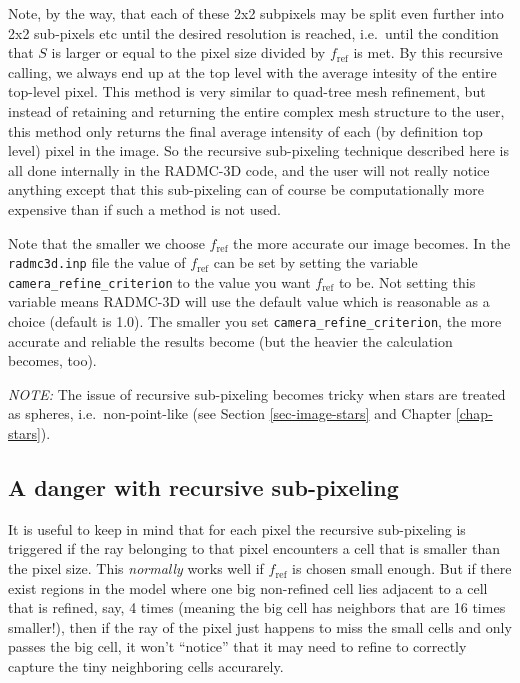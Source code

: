 \documentclass{report}
\begin{document}
Note, by the way, that each of these 2x2 subpixels may be split even further
into 2x2 sub-pixels etc until the desired resolution is reached, i.e.\ until
the condition that $S$ is larger or equal to the pixel size divided by
$f_{\mathrm{ref}}$ is met. By this recursive calling, we always end up at
the top level with the average intesity of the entire top-level pixel.  This
method is very similar to quad-tree mesh refinement, but instead of
retaining and returning the entire complex mesh structure to the user, this
method only returns the final average intensity of each (by definition top
level) pixel in the image. So the recursive sub-pixeling technique described
here is all done internally in the RADMC-3D code, and the user will not
really notice anything except that this sub-pixeling can of course be 
computationally more expensive than if such a method is not used. 

Note that the smaller we choose $f_{\mathrm{ref}}$ the more accurate our
image becomes. In the {\small\tt radmc3d.inp} file the value of $f_{\mathrm{ref}}$
can be set by setting the variable {\small\tt camera\_refine\_criterion} to the
value you want $f_{\mathrm{ref}}$ to be. Not setting this variable means
RADMC-3D will use the default value which is reasonable as a choice (default 
is 1.0). The smaller you set {\small\tt camera\_refine\_criterion}, the 
more accurate and reliable the results become (but the heavier the calculation
becomes, too). 

{\em NOTE:} The issue of recursive sub-pixeling becomes tricky when stars
are treated as spheres, i.e.\ non-point-like (see Section
\ref{sec-image-stars} and Chapter \ref{chap-stars}).


\subsection{A danger with recursive sub-pixeling}
It is useful to keep in mind that for each pixel the recursive sub-pixeling
is triggered if the ray belonging to that pixel encounters a cell that is
smaller than the pixel size. This {\em normally} works well if
$f_{\mathrm{ref}}$ is chosen small enough. But if there exist regions in the
model where one big non-refined cell lies adjacent to a cell that is
refined, say, 4 times (meaning the big cell has neighbors that are 16 times
smaller!), then if the ray of the pixel just happens to miss the small cells
and only passes the big cell, it won't ``notice'' that it may need to refine
to correctly capture the tiny neighboring cells accurarely. 
\end{document}
